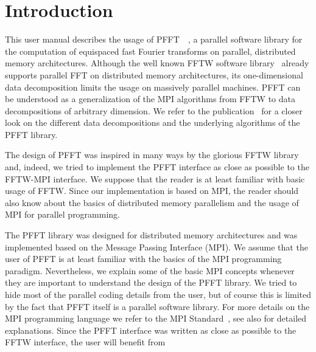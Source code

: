 \chapter{Introduction}\label{chap:intro}
This user manual describes the usage of PFFT~\pfftversion~\cite{Pi13,pfft}, a parallel software library for the
computation of equispaced fast Fourier transforms on parallel, distributed memory architectures.
Although the well known FFTW software library~\cite{fftw, FFTW05} already supports parallel FFT
on distributed memory architectures, its one-dimensional data decomposition limits the usage on
massively parallel machines. PFFT can be understood as a generalization of the MPI algorithms
from FFTW to data decompositions of arbitrary dimension.
We refer to the publication~\cite{Pi13} for a closer look on the
different data decompositions and the underlying algorithms of the PFFT library.

The design of PFFT was inspired in many ways by the glorious FFTW library~\cite{fftw,FFTW05} and,
indeed, we tried to implement the PFFT interface as close as possible to the FFTW-MPI interface.
We suppose that the reader is at least familiar with basic usage of FFTW. Since our implementation is based on
MPI, the reader should also know about the basics of distributed memory parallelism and the usage of MPI for parallel
programming.


The PFFT library was designed for distributed memory architectures and was implemented based on the Message Passing Interface (MPI).
We assume that the user of PFFT is at least familiar with the basics of the MPI programming paradigm.
Nevertheless, we explain some of the basic MPI concepts whenever they are important to understand
the design of the PFFT library. We tried to hide most of the parallel coding details from the user,
but of course this is limited by the fact that PFFT itself is a parallel software library.
For more details on the MPI programming language we refer to the MPI Standard~\cite{MPI-2.2}, see also \cite{GrLuTh99} for detailed explanations.
Since the PFFT interface was written as close as possible to the FFTW interface, the user will benefit from






